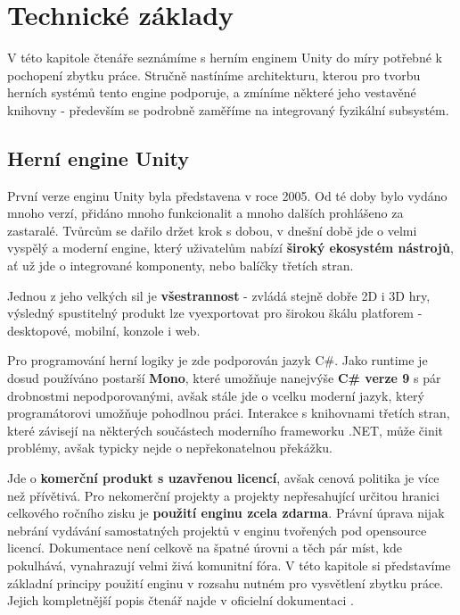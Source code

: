 \chapter{Technické základy}

V této kapitole čtenáře seznámíme s herním enginem Unity \cite{Unity} do míry potřebné k pochopení zbytku práce. Stručně nastíníme architekturu, kterou pro tvorbu herních systémů tento engine podporuje, a zmíníme některé jeho vestavěné knihovny - především se podrobně zaměříme na integrovaný fyzikální subsystém.


\section{Herní engine Unity} \label{unityEngineIntroSection}

První verze enginu Unity byla představena v roce 2005. Od té doby bylo vydáno mnoho verzí, přidáno mnoho funkcionalit a mnoho dalších prohlášeno za zastaralé. Tvůrcům se dařilo držet krok s dobou, v dnešní době jde o velmi vyspělý a moderní engine, který uživatelům nabízí \textbf{široký ekosystém nástrojů}, ať už jde o integrované komponenty, nebo balíčky třetích stran. 

Jednou z jeho velkých sil je \textbf{všestrannost} - zvládá stejně dobře 2D i 3D hry, výsledný spustitelný produkt lze vyexportovat pro širokou škálu platforem - desktopové, mobilní, konzole i web.

Pro programování herní logiky je zde podporován jazyk C\#. Jako runtime je dosud používáno postarší \textbf{Mono}, které umožňuje nanejvýše \textbf{C\# verze 9} s pár drobnostmi nepodporovanými, avšak stále jde o vcelku moderní jazyk, který programátorovi umožňuje pohodlnou práci. Interakce s knihovnami třetích stran, které závisejí na některých součástech moderního frameworku .NET, může činit problémy, avšak typicky nejde o nepřekonatelnou překážku.

Jde o \textbf{komerční produkt s uzavřenou licencí}, avšak cenová politika je více než přívětivá. Pro nekomerční projekty a projekty nepřesahující určitou hranici celkového ročního zisku je \textbf{použití enginu zcela zdarma}. Právní úprava nijak nebrání vydávání samostatných projektů v enginu tvořených pod opensource licencí. Dokumentace není celkově na špatné úrovni a těch pár míst, kde pokulhává, vynahrazují velmi živá komunitní fóra.
\bigbreak
V této kapitole si představíme základní principy použití enginu v rozsahu nutném pro vysvětlení zbytku práce. Jejich kompletnější popis čtenář najde v oficielní dokumentaci \cite{Unity}. 


